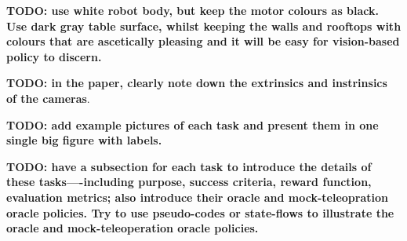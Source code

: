 \textbf{TODO: use white robot body, but keep the motor colours as black. Use dark gray table surface, whilst keeping the walls and rooftops with colours that are ascetically pleasing and it will be easy for vision-based policy to discern.}

\textbf{TODO: in the paper, clearly note down the extrinsics and instrinsics of the cameras}.

\textbf{TODO: add example pictures of each task and present them in one single big figure with labels.}

\textbf{TODO: have a subsection for each task to introduce the details of these tasks----including purpose, success criteria, reward function, evaluation metrics; also introduce their oracle and mock-teleopration oracle policies. Try to use pseudo-codes or state-flows to illustrate the oracle and mock-teleoperation oracle policies.}
